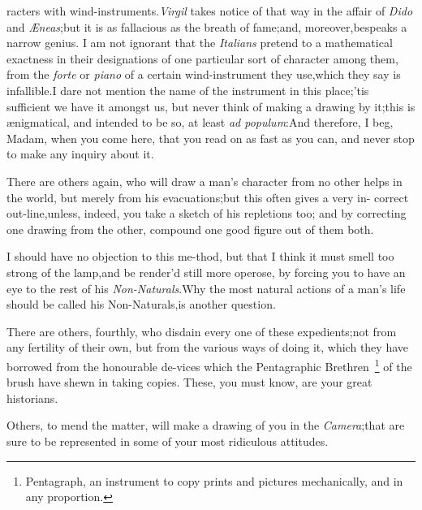 \documentclass{article}
\begin{document}
\noindent
{}
racters with wind-instruments.\tsk  \textit{Virgil} takes notice
of that way in the affair of \textit{Dido} and
\textit{Æneas};\tsk  but it is as fallacious as the breath of
fame;\tsk  and, moreover,\pb bespeaks a narrow genius. I am not
ignorant that the \textit{Italians} pretend to a mathematical
exactness in their designations of one particular sort of
character among them, from the \textit{forte} or \textit{piano}
of a certain wind-instrument they use,\tsk  which they say is
infallible.\tsk  I dare not mention the name of the instrument
in this place;\tsk  ’tis sufficient we have it amongst us,\tsk
but never think of making a drawing by it;\tsk  this is
ænigmatical, and intended to be so, at least \textit{ad
populum}:\tsk  And therefore, I beg, Madam, when you come here,
that you read on as fast as you can, and never stop to make any
inquiry about it.

There are others again, who will draw a man’s character
from no other helps in the world, but merely from his
evacuations;\tsk  but this often gives a very in-\pb
correct out-line,\tsk  unless, indeed, you\break
take a sketch of his repletions too; and\break
by correcting one drawing from the\break
other, compound one good figure out of\break
them both.

I should have no objection to this me-\break thod, but that I think it
must smell too strong of the lamp,\tsk  and be render’d
still more operose, by forcing you to have an eye to the rest of
his \textit{Non-Naturals}.\tsk\break  Why the most natural actions of a
man’s life should be called his Non-Naturals,\tsk\break  is
another question.

There are others, fourthly, who disdain every one of these expedients;\tsk  not from
any fertility of their own, but from the various ways of doing it, which they have
borrowed from the honourable de-\pb vices which the Pentagraphic
Brethren~\footnote{\enspace Pentagraph, an instrument to copy prints and pictures
mechanically, and in any proportion.} of the brush have shewn in
taking co\-pies.\tsk 
These, you must know, are your great historians.

\noindent
{}

Others, to mend the matter, will make a drawing of you in the
\textit{Camera};\tsk  that\break
{}
are sure to be represented in some of your most
ridiculous attitudes.
\end{document}
